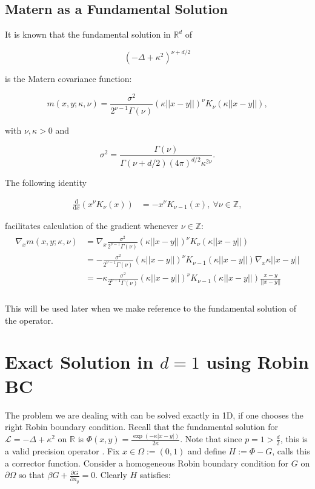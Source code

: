 \documentclass[paper=a4, fontsize=11pt]{scrartcl} %
\numberwithin{equation}{section} %
\numberwithin{figure}{section} %
\numberwithin{table}{section} %
\newcommand{\Op}{\mathcal{L}}
\begin{document}
\subsection{Matern as a Fundamental Solution}
It is known \cite{lindgren2011explicit} that the fundamental solution in $\mathbb{R}^d$ of

$$
(-\Delta + \kappa^2)^{ \nu + d/2 }
$$

is the Matern covariance function:

$$
m(x,y; \kappa, \nu ) = \frac{\sigma^2}{2^{\nu-1}\Gamma(\nu)} (\kappa||x-y||)^{\nu} K_{\nu}( \kappa||x-y||), 
$$

with $\nu, \kappa > 0$ and

$$
\sigma^2 = \frac{\Gamma(\nu)}{\Gamma(\nu + d/2) (4\pi)^{d/2} \kappa^{2\nu}}.
$$

The following identity

\begin{align}\label{diff}
  \frac{\text{d}}{\text{d}x} (x^{\nu} K_{\nu}(x)) &= -x^{\nu}K_{\nu-1}(x), \ \forall \nu \in \mathbb{Z},
\end{align}

facilitates calculation of the gradient whenever $\nu \in \mathbb{Z}$:
\begin{align}\label{grad_matern}
  \begin{split}
  \nabla_{x} m( x,y; \kappa, \nu ) &= \nabla_{x} \frac{\sigma^2}{2^{\nu-1}\Gamma(\nu)} (\kappa||x-y||)^{\nu}K_{\nu}(\kappa||x-y||) \\
  &= -\frac{\sigma^2}{2^{\nu-1}\Gamma(\nu)} (\kappa||x-y||)^{\nu}K_{\nu-1}(\kappa||x-y||) \nabla_{x} \kappa||x-y|| \\
  &= -\kappa\frac{\sigma^2}{2^{\nu-1}\Gamma(\nu)} (\kappa||x-y||)^{\nu}K_{\nu-1}(\kappa||x-y||) \frac{x-y}{||x-y||} \\
  \end{split}
\end{align}

This will be used later when we make reference to the fundamental solution of the operator.

\section{Exact Solution in $d=1$ using Robin BC}
The problem we are dealing with can be solved exactly in 1D, if one chooses the right
Robin boundary condition.
Recall that the fundamental solution for $\Op = -\Delta + \kappa^{2}$ on $\mathbb{R}$ is $\Phi(x,y) = \frac{\exp( -\kappa |x-y| ) }{2\kappa}$. Note that since $p =1 > \frac{d}{2}$, this is a valid precision operator \cite{stuart2010inverse}. Fix $x \in \Omega := (0,1)$ and define $H:=  \Phi - G$,  \cite{evans} calls this a corrector function. 
Consider a homogeneous Robin boundary condition
for $G$ on $\partial \Omega$ so that $\beta G + \frac{ \partial G}{\partial n_{y}} = 0$.
Clearly $H$ satisfies:
\end{document}
